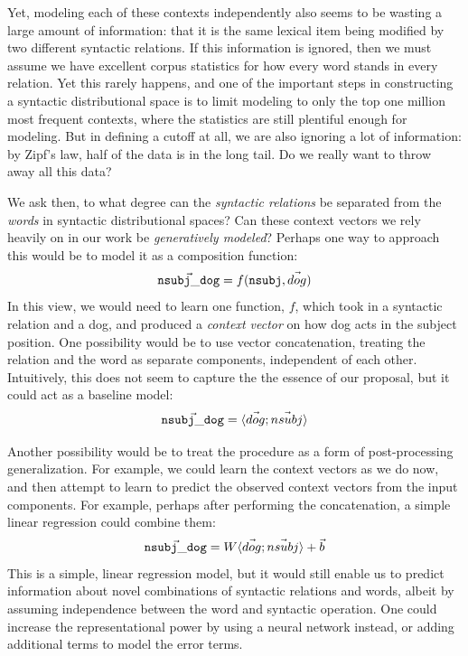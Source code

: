 \documentclass[12pt]{article}
\begin{document}
Yet, modeling each of these contexts independently also seems to be wasting
a large amount of information: that it is the same lexical item being modified
by two different syntactic relations. If this information is ignored, then
we must assume we have excellent corpus statistics for how every word stands
in every relation. Yet this rarely happens, and one of the important
steps in constructing a syntactic distributional space is to limit modeling
to only the top one million most frequent contexts, where the statistics are
still plentiful enough for modeling. But in defining a cutoff at all, we
are also ignoring a lot of information: by Zipf's law, half of the data
is in the long tail. Do we really want to throw away all this data?

We ask then, to what degree can the {\em syntactic relations} be separated
from the {\em words} in syntactic distributional spaces? 
Can these context vectors we rely heavily on in our work be {\em generatively
modeled}? Perhaps one way to approach this would be to model it as a
composition function:
\begin{equation*}
  \vec{ {\tt nsubj\_dog} } = f({\tt nsubj}, \vec{dog})
\end{equation*}
In this view, we would need to learn one function, $f$, which took in a syntactic
relation and a dog, and produced a {\em context vector} on how dog acts in the
subject position. One possibility would be to use vector concatenation,
treating the relation and the word as separate components, independent of each
other. Intuitively, this does not seem to capture the the essence of our
proposal, but it could act as a baseline model:
\begin{equation*}
  \vec{ {\tt nsubj\_dog} } = \langle \vec{dog} ; \vec{nsubj} \rangle
\end{equation*}

Another possibility would be to treat the procedure as a form of post-processing
generalization. For example, we could learn the context vectors as we do now, and
then attempt to learn to predict the observed context vectors from the input
components. For example, perhaps after performing the concatenation, a simple
linear regression could combine them:
\begin{equation*}
  \vec{ {\tt nsubj\_dog} } = W\langle \vec{dog} ; \vec{nsubj} \rangle + \vec{b}
\end{equation*}
This is a simple, linear regression model, but it would still enable us to
predict information about novel combinations of syntactic relations and words,
albeit by assuming independence between the word and syntactic operation. One
could increase the representational power by using a neural network instead,
or adding additional terms to model the error terms.
\end{document}
